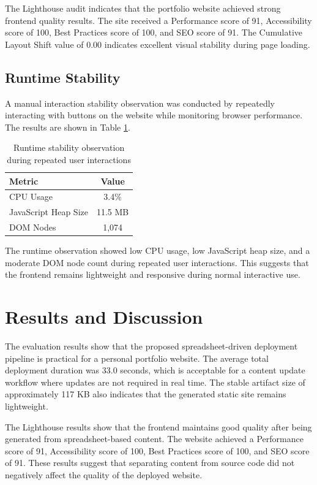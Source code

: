 \documentclass[10pt,a4paper,twocolumn]{article}
\begin{document}
The Lighthouse audit indicates that the portfolio website achieved strong frontend quality results. The site received a Performance score of 91, Accessibility score of 100, Best Practices score of 100, and SEO score of 91. The Cumulative Layout Shift value of 0.00 indicates excellent visual stability during page loading.

\subsection{Runtime Stability}

A manual interaction stability observation was conducted by repeatedly interacting with buttons on the website while monitoring browser performance. The results are shown in Table \ref{tab:runtime-stability}.

\begin{table}[H]
\centering
\caption{Runtime stability observation during repeated user interactions}
\label{tab:runtime-stability}
\small
\begin{tabular}{lc}
\toprule
Metric & Value\\
\midrule
CPU Usage & 3.4\%\\
JavaScript Heap Size & 11.5 MB\\
DOM Nodes & 1,074\\
\bottomrule
\end{tabular}
\end{table}

The runtime observation showed low CPU usage, low JavaScript heap size, and a moderate DOM node count during repeated user interactions. This suggests that the frontend remains lightweight and responsive during normal interactive use.

\section{Results and Discussion}

The evaluation results show that the proposed spreadsheet-driven deployment pipeline is practical for a personal portfolio website. The average total deployment duration was 33.0 seconds, which is acceptable for a content update workflow where updates are not required in real time. The stable artifact size of approximately 117 KB also indicates that the generated static site remains lightweight.

The Lighthouse results show that the frontend maintains good quality after being generated from spreadsheet-based content. The website achieved a Performance score of 91, Accessibility score of 100, Best Practices score of 100, and SEO score of 91. These results suggest that separating content from source code did not negatively affect the quality of the deployed website.
\end{document}

